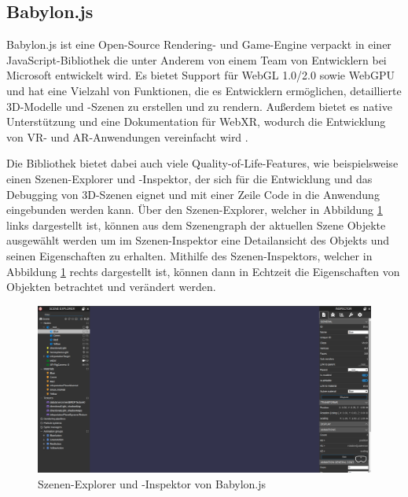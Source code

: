\subsection{Babylon.js}

Babylon.js ist eine Open-Source Rendering- und Game-Engine verpackt in einer JavaScript-Bibliothek die unter Anderem von einem Team von Entwicklern bei Microsoft entwickelt wird.
Es bietet Support für WebGL 1.0/2.0 sowie WebGPU und hat eine Vielzahl von Funktionen, die es Entwicklern ermöglichen, detaillierte 3D-Modelle und -Szenen zu erstellen und zu rendern.
Außerdem bietet es native Unterstützung und eine Dokumentation für WebXR, wodurch die Entwicklung von VR- und AR-Anwendungen vereinfacht wird \autocite[][]{babylon-features}.

Die Bibliothek bietet dabei auch viele Quality-of-Life-Features, wie beispielsweise einen Szenen-Explorer und -Inspektor, der sich für die Entwicklung und das Debugging von 3D-Szenen eignet und mit einer Zeile Code in die Anwendung eingebunden werden kann.
Über den Szenen-Explorer, welcher in Abbildung \ref{fig:babylon-inspector} links dargestellt ist, können aus dem Szenengraph der aktuellen Szene Objekte ausgewählt werden um im Szenen-Inspektor eine Detailansicht des Objekts und seinen Eigenschaften zu erhalten.
Mithilfe des Szenen-Inspektors, welcher in Abbildung \ref{fig:babylon-inspector} rechts dargestellt ist,  können dann in Echtzeit die Eigenschaften von Objekten betrachtet und verändert werden.

\begin{figure}[H]
  \centering
  \includegraphics[width=1\textwidth]{images/Babylon-Inspector.png}
  \caption{Szenen-Explorer und -Inspektor von Babylon.js}
  \label{fig:babylon-inspector}
\end{figure}
